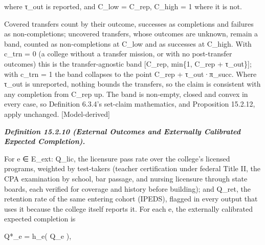 \documentclass[
]{article}
\begin{document}
where τ\_out is reported, and C\_low = C\_rep, C\_high = 1 where it is
not.

Covered transfers count by their outcome, successes as completions and
failures as non-completions; uncovered transfers, whose outcomes are
unknown, remain a band, counted as non-completions at C\_low and as
successes at C\_high. With c\_trn = 0 (a college without a transfer
mission, or with no post-transfer outcomes) this is the
transfer-agnostic band {[}C\_rep, min\{1, C\_rep + τ\_out\}{]}; with
c\_trn = 1 the band collapses to the point C\_rep + τ\_out·π\_succ.
Where τ\_out is unreported, nothing bounds the transfers, so the claim
is consistent with any completion from C\_rep up. The band is non-empty,
closed and convex in every case, so Definition 6.3.4's set-claim
mathematics, and Proposition 15.2.12, apply unchanged.
{[}Model-derived{]}

\emph{\textbf{Definition 15.2.10 (External Outcomes and Externally
Calibrated Expected Completion).}}

For e ∈ E\_ext: Q\_lic, the licensure pass rate over the college's
licensed programs, weighted by test-takers (teacher certification under
federal Title II, the CPA examination by school, bar passage, and
nursing licensure through state boards, each verified for coverage and
history before building); and Q\_ret, the retention rate of the same
entering cohort (IPEDS), flagged in every output that uses it because
the college itself reports it. For each e, the externally calibrated
expected completion is

Q*\_e = h\_e( Q\_e ),
\end{document}

